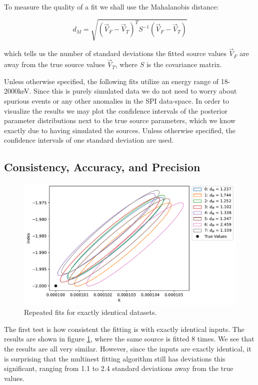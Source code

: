\documentclass{report}
\begin{document}
To measure the quality of a fit we shall use the Mahalanobis distance:

\begin{equation}
  d_M = \sqrt{(\vec{V}_F - \vec{V}_T)^TS^{-1}(\vec{V}_F-\vec{V}_T)}
\end{equation}

which tells us the number of standard deviations the fitted source values $\vec{V}_F$ are away from the true source values $\vec{V}_T$, where $S$ is the covariance matrix.

Unless otherwise specified, the following fits utilize an energy range of 18-2000keV. Since this is purely simulated data we do not need to worry about spurious events or any other anomalies in the SPI data-space. In order to visualize the results we may plot the confidence intervals of the posterior parameter distributions next to the true source parameters, which we know exactly due to having simulated the sources. Unless otherwise specified, the confidence intervals of one standard deviation are used.

\subsection{Consistency, Accuracy, and Precision}

\begin{figure}[h]
  \centering
  \includegraphics[width=\textwidth]{Images/Pure_Simulation/combined_plot_repeated_identical.pdf}
  \caption{Repeated fits for exactly identical datasets.}
  \label{fig ident}
\end{figure}

The first test is how consistent the fitting is with exactly identical inputs. The results are shown in figure \ref{fig ident}, where the same source is fitted 8 times. We see that the results are all very similar. However, since the inputs are exactly identical, it is surprising that the multinest fitting algorithm still has deviations this significant, ranging from 1.1 to 2.4 standard deviations away from the true values. 
\end{document}
